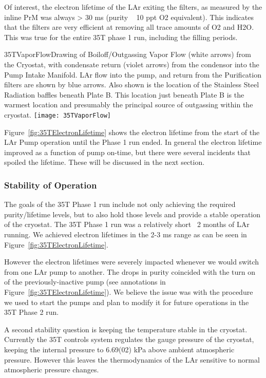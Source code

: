 Of interest, the electron lifetime of the LAr exiting the filters, as measured by the inline PrM was always  
> 30 ms (purity ~ 10 ppt O2 equivalent). This indicates that the filters are very efficient at removing all 
trace amounts of O2 and H2O. This was true for the entire 35T phase 1 run, including the filling periods.

\begin{cdrfigure}{35TVaporFlow}{Drawing of Boiloff/Outgassing Vapor Flow (white 
arrows) from the Cryostat, with condensate return (violet arrows) from the condensor into the Pump 
Intake Manifold. LAr flow into the pump, and return from the Purification filters are shown by blue 
arrows. Also shown is the location of the Stainless Steel Radiation baffles beneath Plate B. This location 
just beneath Plate B is the warmest location and presumably the principal source of outgassing within the 
cryostat.}
  \texttt{[image: 35TVaporFlow]}
\end{cdrfigure}

Figure~\ref{fig:35TElectronLifetime} shows the electron lifetime from the start of the LAr Pump operation until the Phase 1 run ended. In general the electron lifetime improved as a function of pump on-time, but there were several incidents that spoiled the lifetime. These will be discussed in the next section.

\subsubsection {Stability of Operation}

The goals of the 35T Phase 1 run include not only achieving the required purity/lifetime levels, but to 
also hold those levels and provide a stable operation of the cryostat. The 35T Phase 1 run was a relatively 
short  ~2 months of LAr running. We achieved electron lifetimes in the 2-3 ms range as can be seen in 
Figure~\ref{fig:35TElectronLifetime}.

However the electron lifetimes were severely impacted whenever we would switch from one LAr pump to 
another. The drops in purity coincided with the turn on of the previously-inactive pump (see annotations 
in Figure~\ref{fig:35TElectronLifetime}). We believe the issue was with the procedure we used to start the 
pumps and plan to modify it for future operations in the 35T Phase 2 run.

A second stability question is keeping the temperature stable in the cryostat. Currently the 35T controls 
system regulates the gauge pressure of the cryostat, keeping the internal pressure to 6.69(02) kPa above 
ambient atmospheric pressure. However this leaves the thermodynamics of the LAr sensitive to normal 
atmospheric pressure changes.

